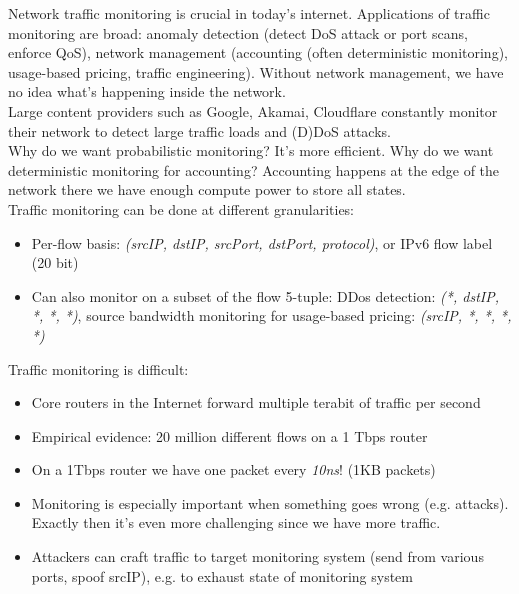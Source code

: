\documentclass[11pt,oneside,a4paper]{article}
\begin{document}
Network traffic monitoring is crucial in today's internet. Applications of traffic monitoring are broad: anomaly detection (detect DoS attack or port scans, enforce QoS), network management (accounting (often deterministic monitoring), usage-based pricing, traffic engineering). Without network management, we have no idea what's happening inside the network.\\
Large content providers such as Google, Akamai, Cloudflare constantly monitor their network to detect large traffic loads and (D)DoS attacks.\\
Why do we want probabilistic monitoring? It's more efficient.
Why do we want deterministic monitoring for accounting? Accounting happens at the edge of the network there we have enough compute power to store all states.\\

Traffic monitoring can be done at different granularities:

\vspace{-\topsep}
\begin{itemize}
	\setlength{\itemsep}{0pt}
	\setlength{\parskip}{0pt}
	\item Per-flow basis: \textit{(srcIP, dstIP, srcPort, dstPort, protocol)}, or IPv6 flow label (20 bit)
	\item Can also monitor on a subset of the flow 5-tuple: DDos detection: \textit{(*, dstIP, *, *, *)}, source bandwidth monitoring for usage-based pricing: \textit{(srcIP, *, *, *, *)}
\end{itemize}
\vspace{-\topsep}

Traffic monitoring is difficult:

\vspace{-\topsep}
\begin{itemize}
	\setlength{\itemsep}{0pt}
	\setlength{\parskip}{0pt}
	\item Core routers in the Internet forward multiple	terabit of traffic per second
	\item Empirical evidence: 20 million different flows on	a 1 Tbps router
	\item On a 1Tbps router we have one packet every \textit{10ns}! (1KB packets)
	\item Monitoring is especially important when something goes wrong (e.g. attacks). Exactly then it's even more challenging since we have more traffic.
	\item Attackers can craft traffic to target monitoring system (send from various ports, spoof srcIP), e.g. to exhaust state of monitoring system
\end{itemize}
\vspace{-\topsep}
\end{document}
